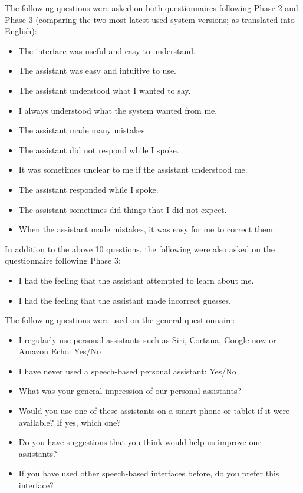 \documentclass[11pt]{article}
\begin{document}
\noindent
The following questions were asked on both questionnaires following Phase 2 and Phase 3 (comparing the two most latest used system versions; as translated into English):
{\small
\begin{itemize}
 \item The interface was useful and easy to understand.
 \item The assistant was easy and intuitive to use.
 \item The assistant understood what I wanted to say.
 \item I always understood what the system wanted from me. 
 \item The assistant made many mistakes. 
 \item The assistant did not respond while I spoke.
 \item It was sometimes unclear to me if the assistant understood me. 
 \item The assistant responded while I spoke. 
 \item The assistant sometimes did things that I did not expect.
 \item When the assistant made mistakes, it was easy for me to correct them. 
\end{itemize}
}

\noindent
In addition to the above 10 questions, the following were also asked on the questionnaire following Phase 3:
{\small
\begin{itemize}
 \item I had the feeling that the assistant attempted to learn about me.
 \item I had the feeling that the assistant made incorrect guesses. 
\end{itemize}
}

\noindent
The following questions were used on the general questionnaire:
{\small
\begin{itemize}
 \item I regularly use personal assistants such as Siri, Cortana, Google now or Amazon Echo: Yes/No
 \item I have never used a speech-based personal assistant: Yes/No
 \item What was your general impression of our personal assistants?
 \item Would you use one of these assistants on a smart phone or tablet if it were available? If yes, which one?
 \item Do you have suggestions that you think would help us improve our assistants?
 \item If you have used other speech-based interfaces before, do you prefer this interface?
\end{itemize}
}




\end{document}
